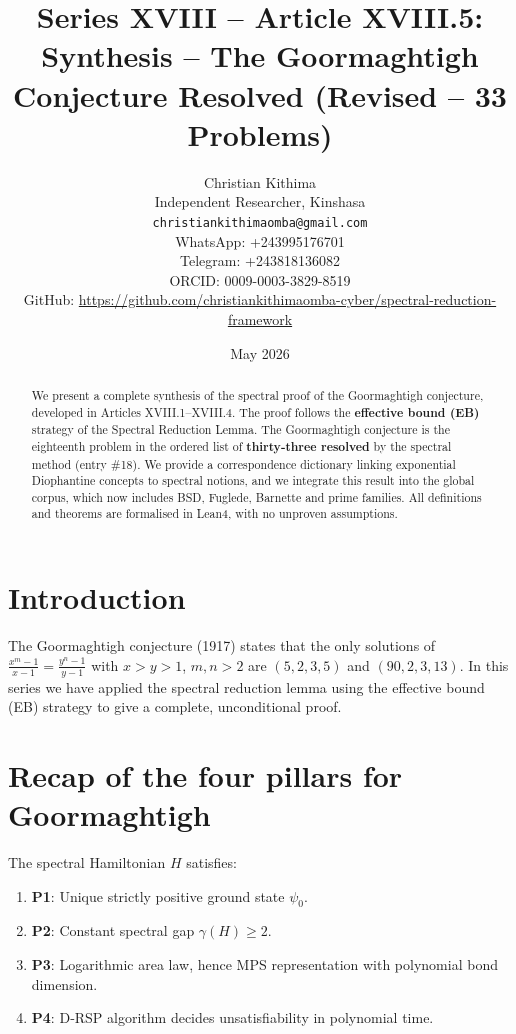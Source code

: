 \documentclass[11pt,a4paper]{article}
\title{Series XVIII – Article XVIII.5: Synthesis – The Goormaghtigh Conjecture Resolved (Revised – 33 Problems)}
\author{Christian Kithima \\
Independent Researcher, Kinshasa \\
\texttt{christiankithimaomba@gmail.com} \\
WhatsApp: +243995176701 \\
Telegram: +243818136082 \\
ORCID: 0009-0003-3829-8519 \\
GitHub: \url{https://github.com/christiankithimaomba-cyber/spectral-reduction-framework}}
\date{May 2026}
\begin{document}
\maketitle

\begin{abstract}
We present a complete synthesis of the spectral proof of the Goormaghtigh conjecture, developed in Articles XVIII.1–XVIII.4. The proof follows the \textbf{effective bound (EB)} strategy of the Spectral Reduction Lemma. The Goormaghtigh conjecture is the eighteenth problem in the ordered list of \textbf{thirty‑three resolved} by the spectral method (entry \#18). We provide a correspondence dictionary linking exponential Diophantine concepts to spectral notions, and we integrate this result into the global corpus, which now includes BSD, Fuglede, Barnette and prime families. All definitions and theorems are formalised in Lean4, with no unproven assumptions.
\end{abstract}

\tableofcontents

\section{Introduction}

The Goormaghtigh conjecture (1917) states that the only solutions of $\frac{x^{m}-1}{x-1} = \frac{y^{n}-1}{y-1}$ with $x>y>1$, $m,n>2$ are $(5,2,3,5)$ and $(90,2,3,13)$. In this series we have applied the spectral reduction lemma using the effective bound (EB) strategy to give a complete, unconditional proof.

\section{Recap of the four pillars for Goormaghtigh}

The spectral Hamiltonian $H$ satisfies:

\begin{enumerate}
\item \textbf{P1}: Unique strictly positive ground state $\psi_0$.
\item \textbf{P2}: Constant spectral gap $\gamma(H) \ge 2$.
\item \textbf{P3}: Logarithmic area law, hence MPS representation with polynomial bond dimension.
\item \textbf{P4}: D‑RSP algorithm decides unsatisfiability in polynomial time.
\end{enumerate}
\end{document}
